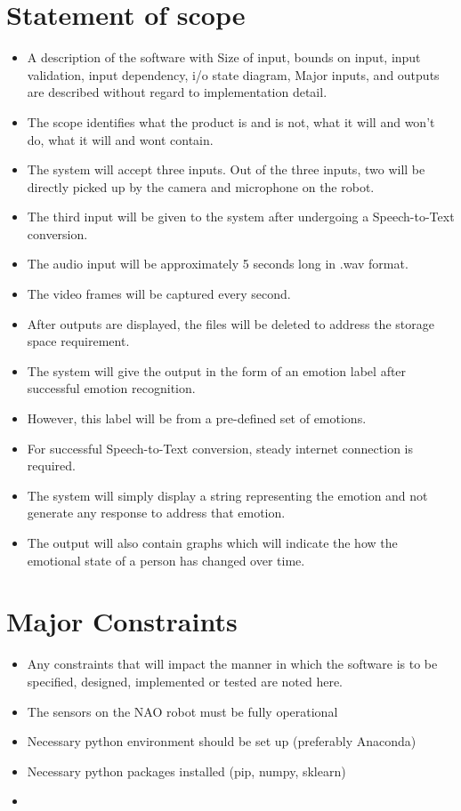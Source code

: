 \documentclass[oneside,a4paper,12pt]{report}
\begin{document}
\begin{normalsize}
 \section{Statement of scope}
	\begin{itemize}  
	\item	A description of the software with Size of input, bounds on input, input validation, input dependency, i/o state diagram, Major inputs, and outputs are described without regard to implementation detail.
	\item The scope identifies what the product is and is not, what it will and won’t do, what it will and wont contain.
	
	
	\item The system will accept three inputs. Out of the three inputs, two will be directly picked up by the camera and microphone on the robot.
	\item The third input will be given to the system after undergoing a Speech-to-Text conversion.
	\item The audio input will be approximately 5 seconds long in .wav format.
	\item The video frames will be captured every second.
	\item After outputs are displayed, the files will be deleted to address the storage space requirement.
	\item The system will give the output in the form of an emotion label after successful emotion recognition.
	\item However, this label will be from a pre-defined set of emotions.
	\item For successful Speech-to-Text conversion, steady internet connection is required.
	\item The system will simply display a string representing the emotion and not generate any response to address that emotion.
	\item The output will also contain graphs which will indicate the how the emotional state of a person has changed over time.
	\end{itemize}

\vspace{4mm}
\section{Major Constraints}
\begin{itemize}
\item Any constraints that will impact the manner in which the software is to be specified, designed, implemented or tested are noted here.
\item The sensors on the NAO robot must be fully operational
\item Necessary python environment should be set up (preferably Anaconda)
\item Necessary python packages installed (pip, numpy, sklearn)
\item 


\end{itemize}
\end{normalsize}
\end{document}
